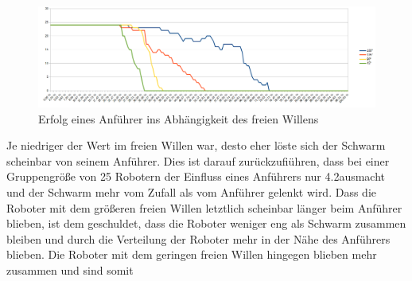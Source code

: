 \begin{figure}
	\includegraphics[width=\textwidth, height=\statisticHeight]{graphics/Statistics/Leader/DependencyFreeWill.png}
	\caption{Erfolg eines Anführer ins Abhängigkeit des freien Willens}
	\label{pic:LeaderDependencyFreeWill}
\end{figure}

Je niedriger der Wert im freien Willen war, desto eher löste sich der Schwarm scheinbar von seinem Anführer. Dies ist darauf zurückzufiühren, dass bei einer Gruppengröße von 25 Robotern der Einfluss eines Anführers nur 4.2\per ausmacht und der Schwarm mehr vom Zufall als vom Anführer gelenkt wird. Dass die Roboter mit dem größeren freien Willen letztlich scheinbar länger beim Anführer blieben, ist dem geschuldet, dass die Roboter weniger eng als Schwarm zusammen bleiben und durch die Verteilung der Roboter mehr in der Nähe des Anführers blieben. Die Roboter mit dem geringen freien Willen hingegen blieben mehr zusammen und sind somit 
%
%
%
